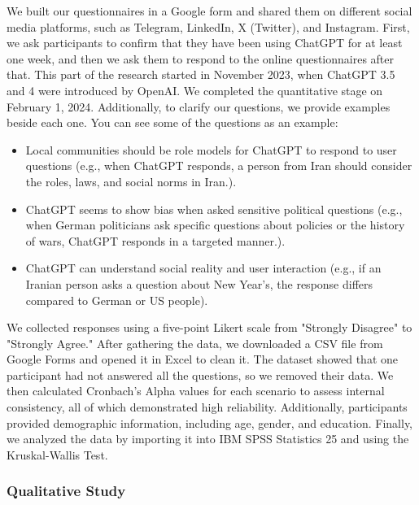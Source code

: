\documentclass[sigconf]{acmart}
\begin{document}
We built our questionnaires in a Google form and shared them on different social media platforms, such as Telegram, LinkedIn, X (Twitter), and Instagram. First, we ask participants to confirm that they have been using ChatGPT for at least one week, and then we ask them to respond to the online questionnaires after that. This part of the research started in November 2023, when ChatGPT 3.5 and 4 were introduced by OpenAI. We completed the quantitative stage on February 1, 2024. Additionally, to clarify our questions, we provide examples beside each one. You can see some of the questions as an example: 

\begin{itemize}

\item Local communities should be role models for ChatGPT to respond to user questions (e.g., when ChatGPT responds, a person from Iran should consider the roles, laws, and social norms in Iran.).

\item ChatGPT seems to show bias when asked sensitive political questions (e.g., when German politicians ask specific questions about policies or the history of wars, ChatGPT responds in a targeted manner.).

\item ChatGPT can understand social reality and user interaction (e.g., if an Iranian person asks a question about New Year's, the response differs compared to German or US people).

\end{itemize}

We collected responses using a five-point Likert scale from "Strongly Disagree" to "Strongly Agree." After gathering the data, we downloaded a CSV file from Google Forms and opened it in Excel to clean it. The dataset showed that one participant had not answered all the questions, so we removed their data. We then calculated Cronbach’s Alpha values for each scenario to assess internal consistency, all of which demonstrated high reliability. Additionally, participants provided demographic information, including age, gender, and education. Finally, we analyzed the data by importing it into IBM SPSS Statistics 25 and using the Kruskal-Wallis Test.
 


\subsubsection{Qualitative Study}
\end{document}
